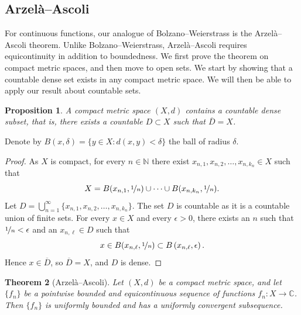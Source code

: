 \documentclass[12pt,openany]{book}
\newcommand{\widebar}[1]{\overline{#1}}
\newcommand{\C}{{\mathbb{C}}}
\newcommand{\N}{{\mathbb{N}}}
\theoremstyle{plain}
\newtheorem{thm}{Theorem}[section]
\newtheorem{prop}[thm]{Proposition}
\theoremstyle{remark}
\theoremstyle{definition}
\theoremstyle{exercise}
\theoremstyle{example}
\begin{document}
\subsection{Arzel\`a--Ascoli}

For continuous functions, our analogue of Bolzano--Weierstrass is
the Arzel\`a--Ascoli theorem.
Unlike Bolzano--Weierstrass, Arzel\`a--Ascoli requires equicontinuity
in addition to boundedness.  We first prove the theorem on compact
metric spaces, and then move to open sets.
We start by showing that a countable
dense set exists in any compact metric space.  We will then be able to apply our
result about countable sets.

\begin{prop}
A compact metric space $(X,d)$ contains a countable dense subset,
that is, there exists a countable $D \subset X$ such that $\widebar{D} = X$.
\end{prop}

Denote by $B(x,\delta) = \bigl\{ y \in X : d(x,y) < \delta \bigr\}$ the ball of radius
$\delta$.

\begin{proof}
As $X$ is compact, for every
$n \in \N$ there exist
$x_{n,1},x_{n,2},\ldots,x_{n,k_n} \in X$ such that
\begin{equation*}
X=
B(x_{n,1},\nicefrac{1}{n})
\cup \cdots \cup
B(x_{n,k_n},\nicefrac{1}{n}) .
\end{equation*}
Let $D = \bigcup_{n=1}^\infty \{ x_{n,1},x_{n,2},\ldots,x_{n,k_n} \}$.
The set $D$ is countable as it is a countable union of finite sets.
For every $x \in X$
and every $\epsilon > 0$, there exists an $n$ such that
$\nicefrac{1}{n} < \epsilon$ and an $x_{n,\ell} \in D$ such that
\begin{equation*}
x \in B(x_{n,\ell},\nicefrac{1}{n}) \subset B\left(x_{n,\ell},\epsilon\right) .
\end{equation*}
Hence $x \in \widebar{D}$, so $\widebar{D} = X$, and $D$ is dense.
\end{proof}


\begin{thm}[Arzel\`a--Ascoli]
\label{thm:arzelaascoli}
Let $(X,d)$ be a compact metric space, and let $\{ f_n \}$
be a pointwise bounded and equicontinuous sequence
of functions $f_n \colon X \to \C$.  Then
$\{f_n\}$ is uniformly bounded and has a uniformly
convergent subsequence.
\end{thm}
\end{document}
